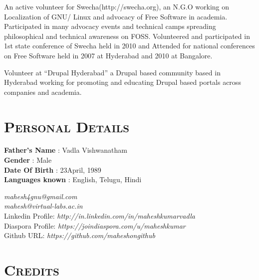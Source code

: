\begin{resume}
\begin{position}
An active volunteer for Swecha(http://swecha.org), an N.G.O working on
Localization of GNU/ Linux and advocacy of Free Software in
academia. Participated in many advocacy events and technical camps
spreading philosophical and technical awareness on FOSS. Volunteered
and participated in 1st state conference of Swecha held in 2010 and
Attended for national conferences on Free Software held in 2007 at
Hyderabad and 2010 at Bangalore.

\end{position}

\begin{position}
Volunteer at ``Drupal Hyderabad'' a Drupal based community based in
Hyderabad working for promoting and educating Drupal based portals
across companies and academia. 
\end{position}


\section{\textsc{Personal Details}}


\textbf{Father's Name} : Vadla Vishwanatham\\
\textbf{Gender} : Male\\
\textbf{Date Of Birth} : 23\third  April, 1989\\
\textbf{Languages known} : English, Telugu, Hindi
\dates{}
\begin{position}
\emph{mahesh4gnu@gmail.com}\\
\emph{mahesh@virtual-labs.ac.in}\\
Linkedin Profile:\emph{ http://in.linkedin.com/in/maheshkumarvadla}\\
Diaspora Profile:\emph{ https://joindiaspora.com/u/maheshkumar}\\
Github URL:\emph{ https://github.com/maheshongithub}
\end{position}

\dates{}

\section{\textsc{Credits}}
\begin{formatb}
  \\
  \body\\
\end{formatb}


\end{resume}
